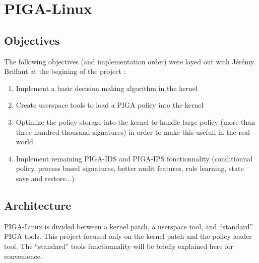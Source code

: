\documentclass[pdftex,a4paper,titlepage,11pt]{article}
\begin{document}


\newpage

\section{PIGA-Linux}

\subsection{Objectives}

The following objectives (and implementation order) were layed out with Jérémy Briffaut at the begining of the project :

\begin{enumerate}
	\item Implement a basic decision making algorithm in the kernel
	\item Create userspace tools to load a PIGA policy into the kernel
	\item Optimize the policy storage into the kernel to handle large policy (more than three hundred thousand signatures) in order to make this usefull in the real world
	\item Implement remaining PIGA-IDS and PIGA-IPS fonctionnality (conditionnal policy, process based signatures, better audit features, rule learning, state save and restore...)
\end{enumerate}

\subsection{Architecture}

PIGA-Linux is divided between a kernel patch, a userspace tool, and ``standard'' PIGA tools. This project focused only on the kernel patch and the policy loader tool. The ``standard'' tools functionnality will be briefly explained here for convenience.
\end{document}
